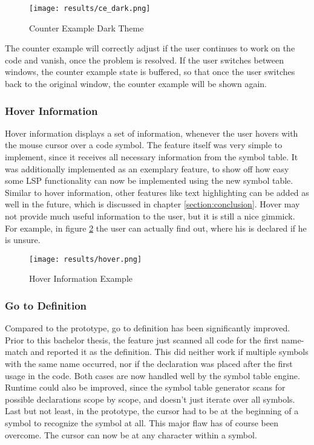 \begin{figure}[H]
    \centering
    \texttt{[image: results/ce\_dark.png]}
    \caption{Counter Example Dark Theme}
    \label{fig:ce_dark}
\end{figure}

The counter example will correctly adjust if the user continues to work on the code and vanish, once the problem is resolved.
If the user switches between windows, the counter example state is buffered, so that once the user switches back to the original window, the counter example will be shown again.

\subsubsection{Hover Information}
Hover information displays a set of information, whenever the user hovers with the mouse cursor over a code symbol.
The feature itself was very simple to implement, since it receives all necessary information from the symbol table.
It was additionally implemented as an exemplary feature, to show off how easy some LSP functionality can now be implemented using the new symbol table.
Similar to hover information, other features like text highlighting can be added as well in the future, which is discussed in chapter \ref{section:conclusion}.
Hover may not provide much useful information to the user, but it is still a nice gimmick.
For example, in figure \ref{fig:hover} the user can actually find out, where his  is declared if he is unsure.

\begin{figure}[H]
    \centering
    \texttt{[image: results/hover.png]}
    \caption{Hover Information Example}
    \label{fig:hover}
\end{figure}

\subsubsection{Go to Definition}
Compared to the prototype, go to definition has been significantly improved.
Prior to this bachelor thesis, the feature just scanned all code for the first name-match and reported it as the definition.
This did neither work if multiple symbols with the same name occurred, nor if the declaration was placed after the first usage in the code.
Both cases are now handled well by the symbol table engine.\\

Runtime could also be improved, since the symbol table generator scans for possible declarations scope by scope, and doesn't just iterate over all symbols.
Last but not least, in the prototype, the cursor had to be at the beginning of a symbol to recognize the symbol at all.
This major flaw has of course been overcome.
The cursor can now be at any character within a symbol.\\

